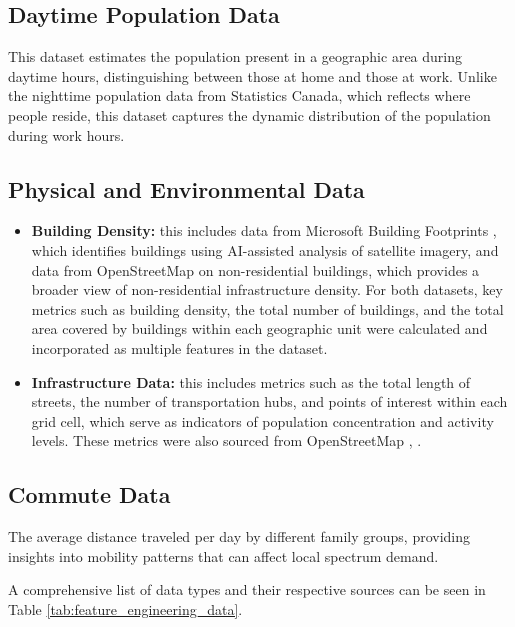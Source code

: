 \documentclass[conference]{IEEEtran}
\begin{document}
\subsection{Daytime Population Data}

This dataset estimates the population present in a geographic area during daytime hours, distinguishing between those at home and those at work. Unlike the nighttime population data from Statistics Canada, which reflects where people reside, this dataset captures the dynamic distribution of the population during work hours.

\subsection{Physical and Environmental Data}

\begin{itemize}[label=-]
\item \textbf{Building Density:}
this includes data from Microsoft Building Footprints \cite{microsoft_building_footprints}, which identifies buildings using AI-assisted analysis of satellite imagery, and data from OpenStreetMap on non-residential buildings, which provides a broader view of non-residential infrastructure density. For both datasets, key metrics such as building density, the total number of buildings, and the total area covered by buildings within each geographic unit were calculated and incorporated as multiple features in the dataset.
\item \textbf{Infrastructure Data:} 
this includes metrics such as the total length of streets, the number of transportation hubs, and points of interest within each grid cell, which serve as indicators of population concentration and activity levels. These metrics were also sourced from OpenStreetMap \cite{statscan_road_network}, \cite{openstreetmap_poi}.

\end{itemize}

\subsection{Commute Data}
The average distance traveled per day by different family groups, providing insights into mobility patterns that can affect local spectrum demand.

A comprehensive list of data types and their respective sources can be seen in Table \ref{tab:feature_engineering_data}.
\end{document}
